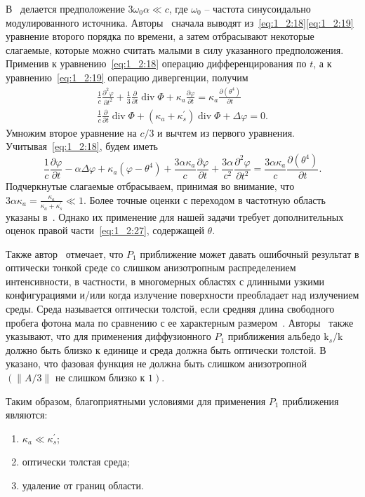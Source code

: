 В~\cite{FishkinGratton1993, HaskellEtAl1994} делается предположение
$3 \omega_{0} \alpha \ll c$, где $\omega_{0}$ -- частота
синусоидально модулированного источника.
Авторы~\cite{Boas1996, HaskellEtAl1994} сначала выводят
из~\eqref{eq:1_2:18}\eqref{eq:1_2:19} уравнение
второго порядка по времени,
а затем отбрасывают некоторые слагаемые, которые можно считать
малыми в силу указанного предположения.
Применив к уравнению~\eqref{eq:1_2:18} операцию дифференцирования
по $t$, а к уравнению~\eqref{eq:1_2:19} операцию дивергенции, получим
\[
    \begin{gathered}
        \frac{1}{c} \frac{\partial^{2} \varphi}{\partial t^{2}}+\frac{1}{3}
        \frac{\partial}{\partial t} \operatorname{div} \Phi+
        \kappa_{a} \frac{\partial \varphi}{\partial t}=\kappa_{a}
        \frac{\partial\left(\theta^{4}\right)}{\partial t} \\
        \frac{1}{c} \frac{\partial}{\partial t} \operatorname{div}
        \Phi+\left(\kappa_{a}+\kappa_{s}^{\prime}\right)
        \operatorname{div} \Phi+\Delta \varphi=0.
    \end{gathered}
\]
Умножим второе уравнение на $c/3$ и вычтем из первого уравнения.
Учитывая~\eqref{eq:1_2:18}, будем иметь
\begin{equation}
    \label{eq:1_2:27}
    \frac{1}{c} \frac{\partial \varphi}{\partial t}-\alpha \Delta
    \varphi+\kappa_{a}\left(\varphi-\theta^{4}\right)+\frac{3 \alpha \kappa_{a}}{c}
    \frac{\partial \varphi}{\partial t}+\frac{3 \alpha}{c^{2}}
    \frac{\partial^{2} \varphi}{\partial t^{2}}=\frac{3 \alpha \kappa_{a}}{c}
    \frac{\partial\left(\theta^{4}\right)}{\partial t}.
\end{equation}
Подчеркнутые слагаемые отбрасываем, принимая во внимание,
что $3 \alpha \kappa_{a}=\frac{\kappa_{a}}{\kappa_{a}+\kappa_{s}^{\prime}} \ll 1$.
Более точные оценки с переходом в частотную область указаны
в~\cite{Boas1996, FishkinGratton1993}.
Однако их применение для нашей задачи требует
дополнительных оценок правой части~\eqref{eq:1_2:27}, содержащей $\theta$.


Также автор~\cite[509]{modest2013radiative} отмечает, что $P_{1}$ приближение
может давать ошибочный результат в оптически тонкой среде со
слишком анизотропным распределением интенсивности, в частности,
в многомерных областях с длинными узкими конфигурациями
и/или когда излучение поверхности преобладает над излучением среды.
Среда называется оптически толстой, если средняя длина
свободного пробега фотона мала по сравнению
с ее характерным размером~\cite[343]{Ozisik1976}.
Авторы~\cite[228]{Keiz1972} также указывают,
что для применения диффузионного $P_{1}$ приближения альбедо
$\mathrm{k}_{s} / \mathrm{k}$ должно быть близко к единице и
среда должна быть оптически толстой.
В~\cite[8]{Boas1996} указано, что фазовая функция
не должна быть слишком анизотропной
$(\|A / 3\| \text{ не слишком близко к } 1)$.

Таким образом, благоприятными условиями для
применения $P_{1}$ приближения являются:
\begin{enumerate}
    \item $\kappa_{a} \ll \kappa_{s}^{\prime}$;

    \item оптически толстая среда;

    \item удаление от границ области.
\end{enumerate}
\FloatBarrier
